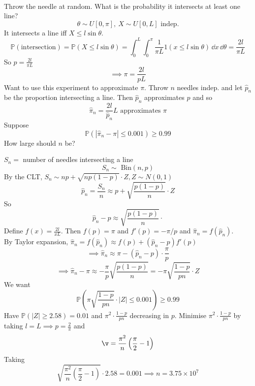 \begin{example}
\\
Throw the needle at random. What is the probability it intersects at least one line?
\[\theta \sim U[0,\pi], \ X \sim U[0,L]\text{ indep.}\]
It intersects a line iff $X\leq l\sin\theta$.
\[\mathbb{P}(\text{intersection}) = \mathbb{P} (X\leq l\sin\theta) = \int_0^L\int_0^{\pi}\frac{1}{\pi L} 1(x\leq l\sin\theta)\,\dd x\,\dd \theta = \frac{2l}{\pi L}\]
So $p = \frac{2l}{\pi L}$
\[\implies\pi = \frac{2l}{pL}\]
Want to use this experiment to approximate $\pi$. Throw $n$ needles indep. and let $\hat{p}_n$ be the proportion intersecting a line. Then $\hat{p}_n$ approximates $p$ and so
\[\hat{\pi}_n = \frac{2l}{\hat{p}_n}L\text{ approximates }\pi\]
Suppose
\[\mathbb{P}(|\hat{\pi}_n - \pi|\leq 0.001) \geq 0.99\]
How large should $n$ be?
\end{example}
\begin{example}[cont.]


$S_n =$ number of needles intersecting a line
\[S_n \sim \text{ Bin}(n,p)\]
By the CLT, $S_n \sim np + \sqrt{np(1-p)}\cdot Z, Z\sim N(0,1)$
\[\hat{p}_n  = \frac{S_n}{n} \approx p + \sqrt{\frac{p(1-p)}{n}}\cdot Z\]
So
\[\hat{p}_n- p \approx \sqrt{\frac{p(1-p)}{n}}\cdot \]
Define $f(x) = \frac{2l}{xL}$. Then $f(p) = \pi$ and $f'(p) = -\pi/p$ and $\hat{\pi}_n= f(\hat{p}_n)$.\\
By Taylor expansion, $\hat{\pi}_n = f(\hat{p}_n) \approx f(p) + (\hat{p}_n - p)f'(p)$
\[\implies\hat{\pi}_n\approx \pi - (\hat{p}_n    - p) \cdot\frac{\pi}{p}\]
\[\implies\hat{\pi}_n - \pi\approx -\frac{\pi}{p}\sqrt{\frac{p(1-p)}{n}} = -\pi \sqrt{\frac{1-p}{pn}}\cdot Z\]
We want
\[\mathbb{P}\left(\pi\sqrt{\frac{1-p}{pn}} \cdot |Z| \leq 0.001\right) \geq 0.99\]
Have $\mathbb{P}(|Z|\geq 2.58) = 0.01$ and $\pi^2 \cdot \frac{1-p}{pn}$ decreasing in $p$. Minimise $\pi^2 \cdot \frac{1-p}{pn}$ by taking $l = L \implies p = \frac{2}{\pi}$ and 
\[\v = \frac{\pi^2}{n} \left(\frac{\pi}{2} - 1\right)\]
Taking
\[\sqrt{\frac{\pi^2}{n} \left(\frac{\pi}{2} - 1\right)} \cdot 2.58 = 0.001 \implies n = 3.75\times 10^7\]

\end{example}
